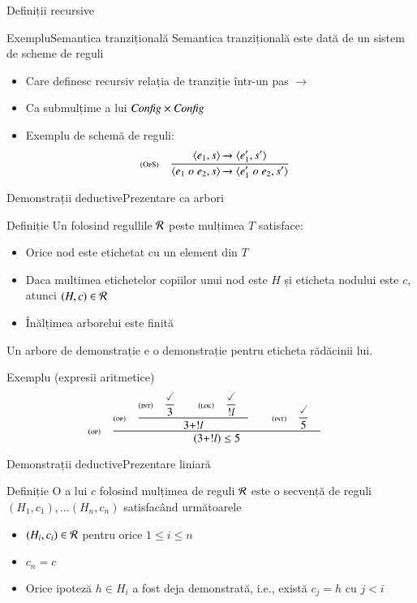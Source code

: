 \documentclass[xcolor=pdftex,romanian,colorlinks]{beamer}
\begin{document}
\begin{section}{Definiții recursive}
\begin{frame}{Exemplu}{Semantica tranzițională}
Semantica tranzițională este dată de un sistem de scheme de reguli
\begin{itemize}
\item Care definesc recursiv relația de tranziție într-un pas $\longrightarrow$
\item Ca submulțime a lui ${\it Config}\times {\it Config}$
\item Exemplu de schemă de reguli:
\[\reg[OpS]{\Ss{\c{e_1 \mathrel{o} e_2,s}}{\c{e_1'\mathrel{o}e_2,s'}}}{\Ss{\c{e_1,s}}{\c{e_1',s'}}}{}\]
\end{itemize}
\end{frame}

\begin{frame}{Demonstrații deductive}{Prezentare ca arbori}
   \begin{block}{Definiție}
       Un  folosind regullile $\cal R$ peste mulțimea $T$ satisface:
     \begin{itemize} 
         \item Orice nod este etichetat cu un element din $T$
        \item Daca multimea etichetelor copiilor unui nod este $H$ și eticheta nodului este $c$, atunci $(H,c) \in \cal R$
         \item Înălțimea arborelui este finită
      \end{itemize}
    Un arbore de demonstrație e o demonstrație pentru eticheta rădăcinii lui.
    \end{block}

 \begin{block}{Exemplu (expresii aritmetice)}
     \[\reg[op]{(3 + ! l) \leq 5 }{
            {\displaystyle\reg[op]{3 + ! l}{\displaystyle\reg[int]{3}{\done}{}\si \reg[loc]{ ! l}{\done}{}}{}\si \reg[int]{5}{\done}{}}{}}{}\]
  \end{block}
\end{frame}

\begin{frame}{Demonstrații deductive}{Prezentare liniară}
   \begin{block}{Definiție}
       O  a lui $c$ folosind mulțimea de reguli $\cal R$  este o secvență
de reguli $(H_1, c_1), \ldots (H_n, c_n)$ satisfacând următoarele    
     \begin{itemize}
          \item $(H_i, c_i) \in \cal R$ pentru orice $1\leq i \leq n$
          \item $c_n = c$
          \item Orice ipoteză $h \in H_i$ a fost deja demonstrată, i.e., există $c_j = h$ cu $j<i$ 
     \end{itemize}
    \end{block}


\end{frame}
\end{section}
\end{document}
